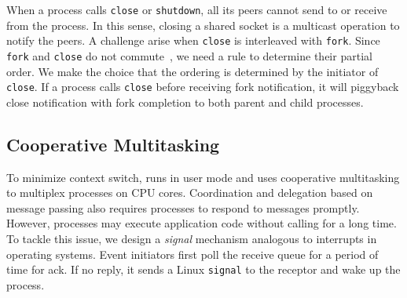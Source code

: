 
When a process calls \texttt{close} or \texttt{shutdown}, all its peers cannot send to or receive from the process. In this sense, closing a shared socket is a multicast operation to notify the peers. A challenge arise when \texttt{close} is interleaved with \texttt{fork}. Since \texttt{fork} and \texttt{close} do not commute~\cite{clements2015scalable}, we need a rule to determine their partial order. We make the choice that the ordering is determined by the initiator of \texttt{close}. If a process calls \texttt{close} before receiving fork notification, it will piggyback close notification with fork completion to both parent and child processes.





\subsection{Cooperative Multitasking}
\label{subsec:process-mux}

To minimize context switch, \sys{} runs in user mode and uses cooperative multitasking to multiplex processes on CPU cores. Coordination and delegation based on message passing also requires processes to respond to messages promptly. However, processes may execute application code without calling \libipc{} for a long time. To tackle this issue, we design a \textit{signal} mechanism analogous to interrupts in operating systems. Event initiators  first poll the receive queue for a period of time for ack. If no reply, it sends a Linux \texttt{signal} to the receptor and wake up the process.

